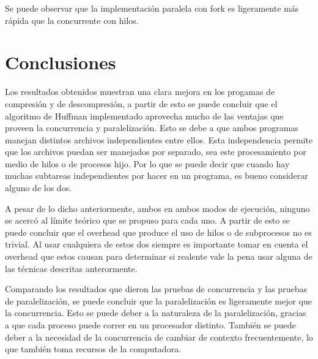 \documentclass{report}
\begin{document}
Se puede observar que la implementación paralela con fork es ligeramente más rápida que la  concurrente con hilos.

\section{Conclusiones}

Los resultados obtenidos muestran una clara mejora en los progamas de compresión y de descompresión, a partir de esto se puede concluir que el algoritmo de Huffman implementado aprovecha mucho de las ventajas que proveen la concurrencia y paralelización. 
Esto se debe a que ambos programas manejan distintos archivos independientes entre ellos.
Esta independencia permite que los archivos puedan ser manejados por separado, sea este procesamiento por medio de hilos o de procesos hijo.
Por lo que se puede decir que cuando hay muchas subtareas independientes por hacer en un programa, es bueno considerar alguno de los dos. 

A pesar de lo dicho anteriormente, ambos en ambos modos de ejecución, ninguno se acercó al límite teórico que se propuso para cada uno.
A partir de esto se puede concluir que el overhead que produce el uso de hilos o de subprocesos no es trivial.
Al usar cualquiera de estos dos siempre es importante tomar en cuenta el overhead que estos causan para determinar si realente vale la pena usar alguna de las técnicas descritas anterormente.

Comparando los resultados que dieron las pruebas de concurrencia y las pruebas de paralelización, se puede concluir que la paralelización es ligeramente mejor que la concurrencia.
Esto se puede deber a la naturaleza de la paralelización, gracias a que cada proceso puede correr en un procesador distinto. 
También se puede deber a la necesidad de la concurrencia de cambiar de contexto frecuentemente, lo que también toma recursos de la computadora.





%

\end{document}
